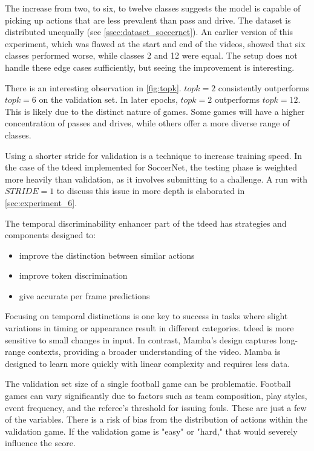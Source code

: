 The increase from two, to six, to twelve classes suggests the model is capable of picking up actions that are less prevalent than pass and drive. The dataset is distributed unequally (see \cref{ssec:dataset_soccernet}). An earlier version of this experiment, which was flawed at the start and end of the videos, showed that six classes performed worse, while classes 2 and 12 were equal. The setup does not handle these edge cases sufficiently, but seeing the improvement is interesting. 

There is an interesting observation in \cref{fig:topk}. $topk=2$ consistently outperforms $topk=6$ on the validation set. In later epochs, $topk=2$ outperforms $topk=12$. This is likely due to the distinct nature of games. Some games will have a higher concentration of passes and drives, while others offer a more diverse range of classes.

Using a shorter stride for validation is a technique to increase training speed. In the case of the \acrshort{tdeed} implemented for SoccerNet, the testing phase is weighted more heavily than validation, as it involves submitting to a challenge. A run with \(STRIDE=1\) to discuss this issue in more depth is elaborated in \cref{sec:experiment_6}. 

The temporal discriminability enhancer part of the \acrlong{tdeed} has strategies and components designed to: 
\begin{itemize}
    \item improve the distinction between similar actions
    \item improve token discrimination
    \item give accurate per frame predictions
\end{itemize}

Focusing on temporal distinctions is one key to success in tasks where slight variations in timing or appearance result in different categories. \acrshort{tdeed} is more sensitive to small changes in input. In contrast, Mamba's design captures long-range contexts, providing a broader understanding of the video. Mamba is designed to learn more quickly with linear complexity and requires less data.

The validation set size of a single football game can be problematic. Football games can vary significantly due to factors such as team composition, play styles, event frequency, and the referee's threshold for issuing fouls. These are just a few of the variables. There is a risk of bias from the distribution of actions within the validation game. If the validation game is "easy" or "hard," that would severely influence the score. 

